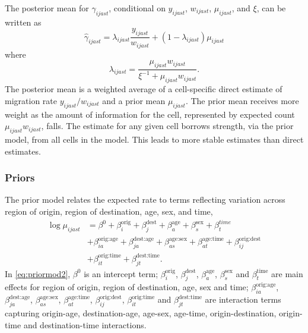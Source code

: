 \documentclass{article}
\begin{document}
The posterior mean for $\gamma_{ijast}$, conditional on $y_{ijast}$, $w_{ijast}$, $\mu_{ijast}$, and $\xi$, can be written as
\begin{equation}
    \hat{\gamma}_{ijast} = \lambda_{ijast} \frac{y_{ijast}}{w_{ijast}} + (1 - \lambda_{ijast}) \mu_{ijast}
\end{equation}
where
\begin{equation}
    \lambda_{ijast} = \frac{\mu_{ijast} w_{ijast}}{\xi^{-1} + \mu_{ijast} w_{ijast}}.
\end{equation}
The posterior mean is a weighted average of a cell-specific direct estimate of migration rate $y_{ijast}/w_{ijast}$ and a prior mean $\mu_{ijast}$. The prior mean receives more weight as the amount of information for the cell, represented by expected count $\mu_{ijast} w_{ijast}$, falls. The estimate for any given cell borrows strength, via the prior model, from all cells in the model. This leads to more stable estimates than direct estimates. 

\subsubsection{Priors}\label{subsec:priors}
The prior model relates the expected rate to terms reflecting variation across region of origin, region of destination, age, sex, and time,
\begin{equation}
\begin{aligned}
 \log \mu_{ijast} &= \beta^0 + \beta_i^{\text{orig}}+\beta_j^{\text{dest}}+\beta_{a}^{\text{age}}+\beta_{s}^{\text{sex}}+\beta_t^{time} \\
 & + \beta_{ia}^{\text{orig:age}}+ \beta_{ja}^{\text{dest:age}}+\beta_{as}^{\text{age:sex}}+\beta_{at}^{\text{age:time}}+ \beta_{ij}^{\text{orig:dest}}\\
 &+\beta_{it}^{\text{orig:time}}+\beta_{jt}^{\text{dest:time}}.  
\end{aligned}\label{eq:priormod2}    
\end{equation}
In \eqref{eq:priormod2}, $\beta^0$ is an intercept term; $\beta_i^{\text{orig}}$, $\beta_j^{\text{dest}}$, $\beta_a^{\text{age}}$, $\beta_s^{\text{sex}}$ and $\beta_t^{\text{time}}$ are main effects for region of origin, region of destination, age, sex and time;    $\beta_{ia}^{\text{orig:age}}$, $\beta_{ja}^{\text{dest:age}}$, $\beta_{as}^{\text{age:sex}}$, $\beta_{at}^{\text{age:time}}$,
$\beta_{ij}^{\text{orig:dest}}$,
$\beta_{it}^{\text{orig:time}}$ and $\beta_{jt}^{\text{dest:time}}$ are interaction terms capturing origin-age, destination-age, age-sex, age-time, origin-destination, origin-time and destination-time interactions. 
\end{document}
